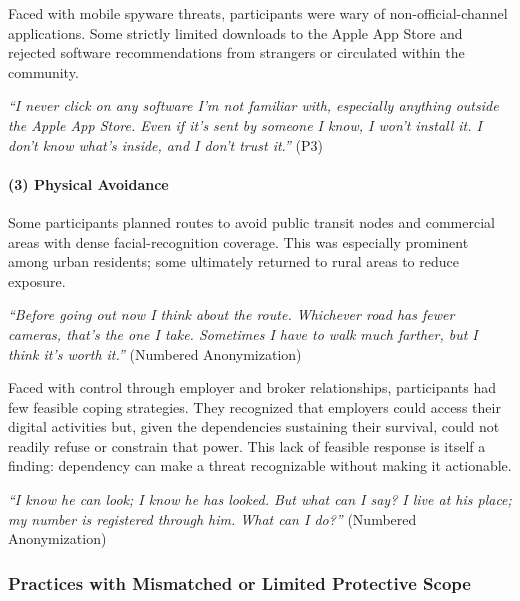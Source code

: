 \documentclass[conference,compsoc]{IEEEtran}
\begin{document}
Faced with mobile spyware threats, participants were wary of non-official-channel applications. Some strictly limited downloads to the Apple App Store and rejected software recommendations from strangers or circulated within the community.

\begin{displayquote}
\textit{``I never click on any software I'm not familiar with, especially anything outside the Apple App Store. Even if it's sent by someone I know, I won't install it. I don't know what's inside, and I don't trust it.''} (P3)
\end{displayquote}

\paragraph{\textbf{(3) Physical Avoidance}}
Some participants planned routes to avoid public transit nodes and commercial areas with dense facial-recognition coverage. This was especially prominent among urban residents; some ultimately returned to rural areas to reduce exposure.

\begin{displayquote}
\textit{``Before going out now I think about the route. Whichever road has fewer cameras, that's the one I take. Sometimes I have to walk much farther, but I think it's worth it.''} (Numbered Anonymization)
\end{displayquote}

Faced with control through employer and broker relationships, participants had few feasible coping strategies. They recognized that employers could access their digital activities but, given the dependencies sustaining their survival, could not readily refuse or constrain that power. This lack of feasible response is itself a finding: dependency can make a threat recognizable without making it actionable.

\begin{displayquote}
\textit{``I know he can look; I know he has looked. But what can I say? I live at his place; my number is registered through him. What can I do?''} (Numbered Anonymization)
\end{displayquote}

\subsubsection{Practices with Mismatched or Limited Protective Scope}
\label{subsubsec:transformed}
\end{document}
